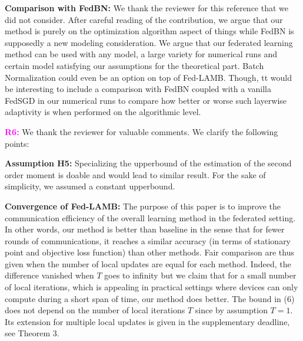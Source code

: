 \documentclass{article}
\begin{document}
\vspace{-2pt}
\textbf{Comparison with FedBN:} We thank the reviewer for this reference that we did not consider.
After careful reading of the contribution, we argue that our method is purely on the optimization algorithm aspect of things while FedBN is supposedly a new modeling consideration.
We argue that our federated learning method can be used with any model, a large variety for numerical runs and certain model satisfying our assumptions for the theoretical part. 
Batch Normalization could even be an option on top of Fed-LAMB.
Though, tt would be interesting to include a comparison with FedBN coupled with a vanilla FedSGD in our numerical runs to compare how better or worse such layerwise adaptivity is when performed on the algorithmic level.

\textbf{\textcolor{magenta}{R6:}} We thank the reviewer for valuable comments. We clarify the following points: \vspace{-4pt}


\textbf{Assumption H5:} Specializing the upperbound of the estimation of the second order moment is doable and would lead to similar result. For the sake of simplicity, we assumed a constant upperbound.

\vspace{-2pt}
\textbf{Convergence of Fed-LAMB:} The purpose of this paper is to improve the communication efficiency of the overall learning method in the federated setting.
In other words, our method is better than baseline in the sense that for fewer rounds of communications, it reaches a similar accuracy (in terms of stationary point and objective loss function) than other methods.
Fair comparison are thus given when the number of local updates are equal for each method. 
Indeed, the difference vanished when $T$ goes to infinity but we claim that for a small number of local iterations, which is appealing in practical settings where devices can only compute during a short span of time, our method does better.
The bound in (6) does not depend on the number of local iterations $T$ since by assumption $T=1$.
Its extension for multiple local updates is given in the supplementary deadline, see Theorem 3.

\end{document}
